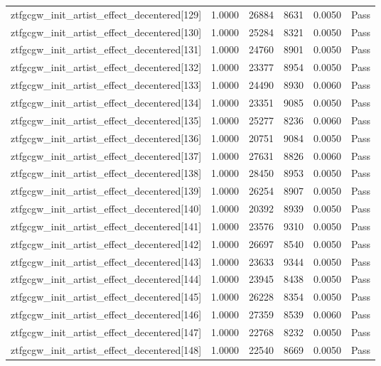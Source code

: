\begin{table}[htbp]
\begin{tabular}{llrrll}
ztfgcgw\_init\_artist\_effect\_decentered[129] & 1.0000 & 26884 & 8631 & 0.0050 & Pass \\
ztfgcgw\_init\_artist\_effect\_decentered[130] & 1.0000 & 25284 & 8321 & 0.0050 & Pass \\
ztfgcgw\_init\_artist\_effect\_decentered[131] & 1.0000 & 24760 & 8901 & 0.0050 & Pass \\
ztfgcgw\_init\_artist\_effect\_decentered[132] & 1.0000 & 23377 & 8954 & 0.0050 & Pass \\
ztfgcgw\_init\_artist\_effect\_decentered[133] & 1.0000 & 24490 & 8930 & 0.0060 & Pass \\
ztfgcgw\_init\_artist\_effect\_decentered[134] & 1.0000 & 23351 & 9085 & 0.0050 & Pass \\
ztfgcgw\_init\_artist\_effect\_decentered[135] & 1.0000 & 25277 & 8236 & 0.0060 & Pass \\
ztfgcgw\_init\_artist\_effect\_decentered[136] & 1.0000 & 20751 & 9084 & 0.0050 & Pass \\
ztfgcgw\_init\_artist\_effect\_decentered[137] & 1.0000 & 27631 & 8826 & 0.0060 & Pass \\
ztfgcgw\_init\_artist\_effect\_decentered[138] & 1.0000 & 28450 & 8953 & 0.0050 & Pass \\
ztfgcgw\_init\_artist\_effect\_decentered[139] & 1.0000 & 26254 & 8907 & 0.0050 & Pass \\
ztfgcgw\_init\_artist\_effect\_decentered[140] & 1.0000 & 20392 & 8939 & 0.0050 & Pass \\
ztfgcgw\_init\_artist\_effect\_decentered[141] & 1.0000 & 23576 & 9310 & 0.0050 & Pass \\
ztfgcgw\_init\_artist\_effect\_decentered[142] & 1.0000 & 26697 & 8540 & 0.0050 & Pass \\
ztfgcgw\_init\_artist\_effect\_decentered[143] & 1.0000 & 23633 & 9344 & 0.0050 & Pass \\
ztfgcgw\_init\_artist\_effect\_decentered[144] & 1.0000 & 23945 & 8438 & 0.0050 & Pass \\
ztfgcgw\_init\_artist\_effect\_decentered[145] & 1.0000 & 26228 & 8354 & 0.0050 & Pass \\
ztfgcgw\_init\_artist\_effect\_decentered[146] & 1.0000 & 27359 & 8539 & 0.0060 & Pass \\
ztfgcgw\_init\_artist\_effect\_decentered[147] & 1.0000 & 22768 & 8232 & 0.0050 & Pass \\
ztfgcgw\_init\_artist\_effect\_decentered[148] & 1.0000 & 22540 & 8669 & 0.0050 & Pass \\

\end{tabular}
\end{table}
